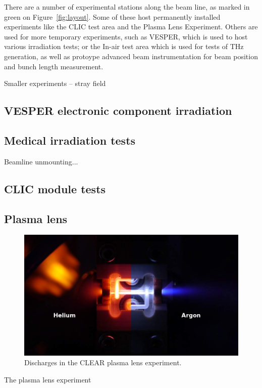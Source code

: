 \documentclass[a4paper,
               keeplastbox,   %
               ]{jacow}
\begin{document}
There are a number of experimental stations along the beam line, as marked in green on Figure~\ref{fig:layout}.
Some of these host permanently installed experiments like the CLIC test area and the Plasma Lens Experiment.
Others are used for more temporary experiments, such as VESPER, which is used to host various irradiation tests; or the In-air test area which is used for tests of THz generation, as well as protoype advanced beam instrumentation for beam position and bunch length measurement.

Smaller experiments -- stray field

\subsection{VESPER electronic component irradiation}

\subsection{Medical irradiation tests}
Beamline unmounting...

\subsection{CLIC module tests}

\subsection{Plasma lens}
\begin{figure}
    \includegraphics[width=\columnwidth]{fig/HeAr.png}
    \caption{Discharges in the CLEAR plasma lens experiment.}
\end{figure}

The plasma lens experiment
\end{document}
